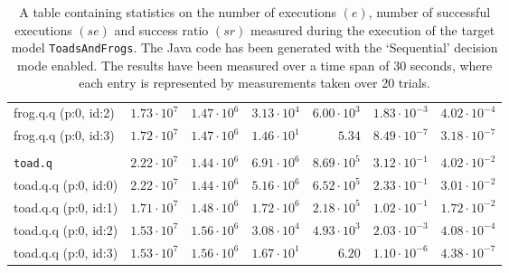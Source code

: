 \begin{table}[htbp]
{\begin{tabular}{lrrrrrr}
\hspace{3mm}frog.q.q (p:0, id:2)              &  $1.73 \cdot 10^{7}$ &  $1.47 \cdot 10^{6}$ &  $3.13 \cdot 10^{4}$ &  $6.00 \cdot 10^{3}$ & $1.83 \cdot 10^{-3}$ & $4.02 \cdot 10^{-4}$ \\
\hspace{3mm}frog.q.q (p:0, id:3)              &  $1.72 \cdot 10^{7}$ &  $1.47 \cdot 10^{6}$ &  $1.46 \cdot 10^{1}$ &               $5.34$ & $8.49 \cdot 10^{-7}$ & $3.18 \cdot 10^{-7}$ \\
\\[-8pt]\texttt{toad.q}                       &  $2.22 \cdot 10^{7}$ &  $1.44 \cdot 10^{6}$ &  $6.91 \cdot 10^{6}$ &  $8.69 \cdot 10^{5}$ & $3.12 \cdot 10^{-1}$ & $4.02 \cdot 10^{-2}$ \\
\hspace{3mm}toad.q.q (p:0, id:0)              &  $2.22 \cdot 10^{7}$ &  $1.44 \cdot 10^{6}$ &  $5.16 \cdot 10^{6}$ &  $6.52 \cdot 10^{5}$ & $2.33 \cdot 10^{-1}$ & $3.01 \cdot 10^{-2}$ \\
\hspace{3mm}toad.q.q (p:0, id:1)              &  $1.71 \cdot 10^{7}$ &  $1.48 \cdot 10^{6}$ &  $1.72 \cdot 10^{6}$ &  $2.18 \cdot 10^{5}$ & $1.02 \cdot 10^{-1}$ & $1.72 \cdot 10^{-2}$ \\
\hspace{3mm}toad.q.q (p:0, id:2)              &  $1.53 \cdot 10^{7}$ &  $1.56 \cdot 10^{6}$ &  $3.08 \cdot 10^{4}$ &  $4.93 \cdot 10^{3}$ & $2.03 \cdot 10^{-3}$ & $4.08 \cdot 10^{-4}$ \\
\hspace{3mm}toad.q.q (p:0, id:3)              &  $1.53 \cdot 10^{7}$ &  $1.56 \cdot 10^{6}$ &  $1.67 \cdot 10^{1}$ &               $6.20$ & $1.10 \cdot 10^{-6}$ & $4.38 \cdot 10^{-7}$ \\
\bottomrule
\end{tabular}
}
\caption{A table containing statistics on the number of executions $(e)$, number of successful executions $(se)$ and success ratio $(sr)$ measured during the execution of the target model \texttt{ToadsAndFrogs}. The Java code has been generated with the `Sequential' decision mode enabled. The results have been measured over a time span of 30 seconds, where each entry is represented by measurements taken over 20 trials.}
\label{table:frequency_results_toadsandfrogs_sequential}
\end{table}